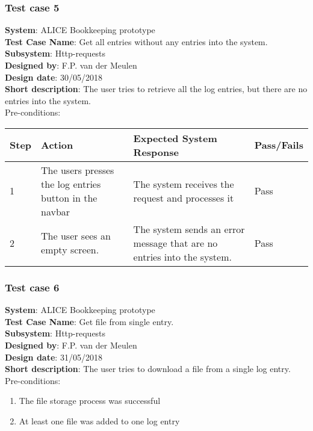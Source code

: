 \subsubsection{Test case 5}
\textbf{System}:  ALICE Bookkeeping prototype \\
\textbf{Test Case Name}:  Get all entries without any entries into the system. \\
\textbf{Subsystem}:  Http-requests \\
\textbf{Designed by}:  F.P. van der Meulen\\
\textbf{Design date}:  30/05/2018\\
\textbf{Short description}: The user tries to retrieve all the log entries, but there are no entries into the system. \\

Pre-conditions: \\

\begin{longtable}{ | p{0.8cm} | p{4.5cm} | p{6cm} | p{1.5cm} |}
\hline
Step & Action & Expected System Response & Pass/Fails  \\ \hline
1 & The users presses the log entries button in the navbar & The system receives the request and processes it & Pass \\ \hline
2 & The user sees an empty screen. & The system sends an error message that are no entries into the system. & Pass \\ \hline

\end{longtable}
\subsubsection{Test case 6}
\textbf{System}:  ALICE Bookkeeping prototype \\
\textbf{Test Case Name}:  Get file from single entry. \\
\textbf{Subsystem}:  Http-requests \\
\textbf{Designed by}:  F.P. van der Meulen\\
\textbf{Design date}:  31/05/2018\\
\textbf{Short description}: The user tries to download a file from a single log entry. \\

Pre-conditions: \\
\begin{enumerate}
\item The file storage process was successful
\item At least one file was added to one log entry
\end{enumerate}

